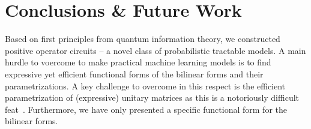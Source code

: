 





\section{Conclusions \& Future Work}
\label{sec:conclusions}

Based on first principles from quantum information theory, we constructed positive operator circuits -- a novel class of probabilistic tractable models.
A main hurdle to voercome to make \puncs practical machine learning models is to find expressive yet efficient functional forms of the bilinear forms and their parametrizations. A key challenge to overcome in this respect is the efficient parametrization of (expressive) unitary matrices as this is a notoriously difficult feat~\citep{kiani2022projunn,jing2017tunable,lezcano2019cheap,mhammedi2017efficient,wisdom2016full}.
Furthermore, we have only presented a specific functional form for the bilinear forms.






